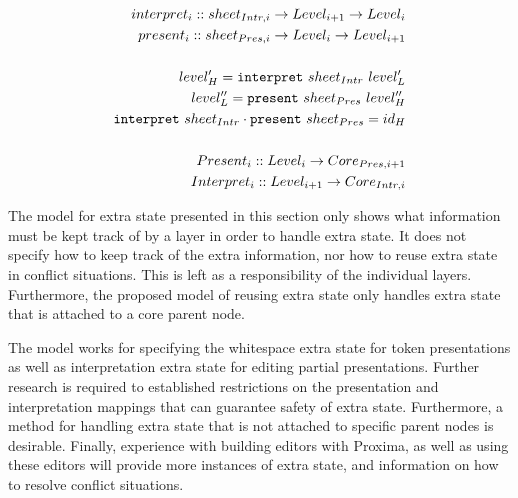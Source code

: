 \begin{small}\begin{align*}%
interpret_{i} :: sheet_{Intr,i} \rightarrow Level_{i+1} \rightarrow Level_{i}\\
present_{i} :: sheet_{Pres,i}  \rightarrow  Level_{i} \rightarrow Level_{i+1}\\
\\
level'_{H} = {\tt interpret}~sheet_{Intr}~level'_{L}\\
level''_{L} = {\tt present}~sheet_{Pres}~level''_{H}\\
{\tt interpret}~sheet_{Intr}  \cdot {\tt present}~sheet_{Pres} = id_{H}\\
\\
Present_{i} :: Level_{i} \rightarrow Core_{Pres,i+1}\\
Interpret_{i} :: Level_{i+1} \rightarrow Core_{Intr,i}\\
\end{align*} 
\end{small}
\center{()}
\ec


The model for extra state presented in this section only shows what information must be kept track of by a layer in order to handle extra state. It does not specify how to keep track of the extra information, nor how to reuse extra state in conflict situations. This is left as a responsibility of the individual layers. Furthermore, the proposed model of reusing extra state only handles extra state that is attached to a core parent node.  

The model works for specifying the whitespace extra state for token presentations as well as interpretation extra state for editing partial presentations. Further research is required to established restrictions on the presentation and interpretation mappings that can guarantee safety of extra state. Furthermore, a method for handling extra state that is not attached to specific parent nodes is desirable.  Finally, experience with building editors with Proxima, as well as using these editors will provide more instances of extra state, and information on how to resolve conflict situations.

